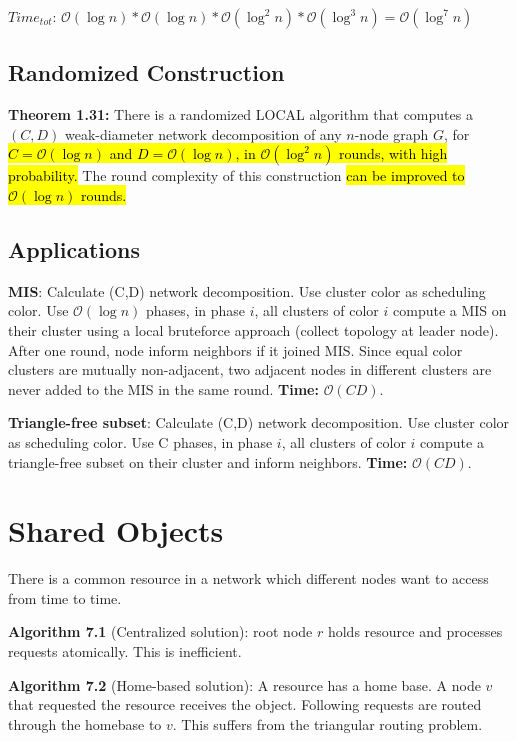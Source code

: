 \documentclass[a4paper, 8pt, landscape]{scrartcl}
\begin{document}
\begin{multicols*}{3}
$Time_{tot}$: $\mathcal{O}(\log n) * \mathcal{O}(\log n) * \mathcal{O}(\log^2 n) * \mathcal{O}(\log^3 n) = \mathcal{O}(\log^7 n)$

\subsection{Randomized Construction}

\textbf{Theorem 1.31:} There is a randomized LOCAL algorithm that computes a $(C,D)$ weak-diameter network decomposition of any $n$-node graph $G$, for \hl{$C = \mathcal{O}(\log n)$ and $D = \mathcal{O}(\log n)$, in $\mathcal{O}(\log^2 n)$ rounds, with high probability.} The round complexity of this construction \hl{can be improved to $\mathcal{O}(\log n)$ rounds.}

\subsection{Applications}

\textbf{MIS}: Calculate (C,D) network decomposition. Use cluster color as scheduling color. Use $\mathcal{O}(\log n)$ phases, in phase $i$, all clusters of color $i$ compute a MIS on their cluster using a local bruteforce approach (collect topology at leader node). After one round, node inform neighbors if it joined MIS. Since equal color clusters are mutually non-adjacent, two adjacent nodes in different clusters are never added to the MIS in the same round. \textbf{Time:} $\mathcal{O}(CD)$.

\textbf{Triangle-free subset}: Calculate (C,D) network decomposition. Use cluster color as scheduling color. Use C phases, in phase $i$, all clusters of color $i$ compute a triangle-free subset on their cluster and inform neighbors. \textbf{Time:} $\mathcal{O}(CD)$.


\section{Shared Objects}

There is a common resource in a network which different nodes want to access from time to time.

\textbf{Algorithm 7.1} (Centralized solution): root node $r$ holds resource and processes requests atomically. This is inefficient.

\textbf{Algorithm 7.2} (Home-based solution): A resource has a home base. A node $v$ that requested the resource receives the object. Following requests are routed through the homebase to $v$. This suffers from the triangular routing problem.


\end{multicols*}
\end{document}
